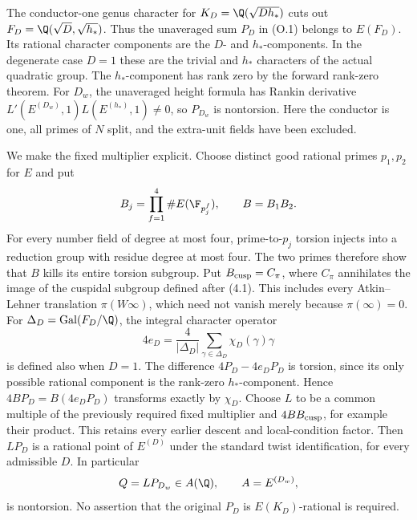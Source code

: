 
The conductor-one genus character for
$K_D=\Q(\sqrt{Dh_*})$ cuts out
$F_D=\Q(\sqrt D,\sqrt{h_*})$. Thus the unaveraged sum $P_D$ in (O.1)
belongs to $E(F_D)$. Its rational character components are the
$D$- and $h_*$-components. In the degenerate case $D=1$ these are
the trivial and $h_*$ characters of the actual quadratic group.
The $h_*$-component has rank zero by the forward rank-zero theorem.
For $D_w$, the unaveraged height formula
\cite[Theorem 1.1]{cst} has Rankin derivative
$L'(E^{(D_w)},1)L(E^{(h_*)},1)\ne0$, so $P_{D_w}$ is nontorsion.
Here the conductor is one, all primes of $N$ split, and the
extra-unit fields have been excluded.

We make the fixed multiplier explicit. Choose distinct good rational
primes $p_1,p_2$ for $E$ and put
\[
 B_j=\prod_{f=1}^{4}\#E(\F_{p_j^f}),\qquad B=B_1B_2.
\]
For every number field of degree at most four, prime-to-$p_j$
torsion injects into a reduction group with residue degree at most
four. The two primes therefore show that $B$ kills its entire
torsion subgroup. Put $B_{\rm cusp}=C_\pi$, where $C_\pi$
annihilates the image of the cuspidal subgroup defined after (4.1).
This includes every Atkin--Lehner translation $\pi(W\infty)$,
which need not vanish merely because $\pi(\infty)=0$. For $\Delta_D=\operatorname{Gal}(F_D/\Q)$,
the integral character operator
\[
 4e_D=\frac4{|\Delta_D|}
                  \sum_{\gamma\in\Delta_D}\chi_D(\gamma)\gamma
\]
is defined also when $D=1$. The difference
$4P_D-4e_DP_D$ is torsion, since its only possible rational
component is the rank-zero $h_*$-component. Hence
$4BP_D=B(4e_DP_D)$ transforms exactly by $\chi_D$.
Choose $L$ to be a common multiple of the previously required fixed
multiplier and $4BB_{\rm cusp}$, for example their product. This
retains every earlier descent and local-condition factor.
Then $LP_D$ is a rational point of
$E^{(D)}$ under the standard twist identification, for every
admissible $D$. In particular
\[
                         Q=LP_{D_w}\in A(\Q),
                 \qquad A=E^{(D_w)},
\]
is nontorsion. No assertion that the original $P_D$ is
$E(K_D)$-rational is required.

